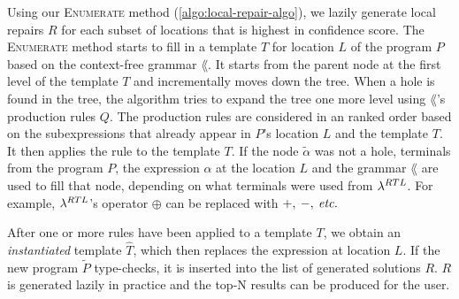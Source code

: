 

Using our \textsc{Enumerate} method (\autoref{algo:local-repair-algo}), we lazily generate local repairs $R$ for
each subset of locations that is highest in confidence score. The
\textsc{Enumerate} method starts to fill in a template $T$ for location $L$ of
the program $P$ based on the context-free grammar $\lang$. It starts from the
parent node at the first level of the template $T$ and incrementally moves
down the tree. When a hole is found in the tree, the algorithm tries to expand
the tree one more level using $\lang$'s production rules $Q$. The production
rules are considered in an ranked order based on the subexpressions that already
appear in $P$'s location $L$ and the template $T$. It then applies the rule to the
template $T$. If the node $\tilde{\alpha}$ was not a hole, terminals from the
program $P$, the expression $\alpha$ at the location $L$ and the grammar
$\lang$ are used to fill that node, depending on what terminals were used from
$\lambda^{RTL}$. For example, $\lambda^{RTL}$'s operator $\oplus$ can be replaced
with $+,\:-,\:\textit{etc.}$

After one or more rules have been applied to a 
template $T$, we obtain an
\emph{instantiated} template $\hat{T}$, which then replaces the expression at
location $L$. If the new program $\tilde{P}$ type-checks, it is inserted into
the list of generated solutions $R$. $R$ is
generated lazily in practice and the top-N results can be produced for the user. 



\lstDeleteShortInline{|}
